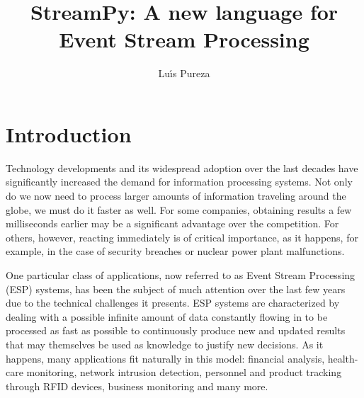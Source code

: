 \documentclass[twoside]{report}
\begin{document}
\title{StreamPy: A new language for Event Stream Processing}
\author{Lu\'{\i}s Pureza}

\maketitle

\tableofcontents

\chapter{Introduction}

Technology developments and its widespread adoption over the last decades have significantly increased the demand for information processing systems. Not only do we now need to process larger amounts of information traveling around the globe, we must do it faster as well. For some companies, obtaining results a few milliseconds earlier may be a significant advantage over the competition. For others, however, reacting immediately is of critical importance, as it happens, for example, in the case of security breaches or nuclear power plant malfunctions.

One particular class of applications, now referred to as Event Stream Processing (ESP) systems, has been the subject of much attention over the last few years due to the technical challenges it presents. ESP systems are characterized by dealing with a possible infinite amount of data constantly flowing in to be processed as fast as possible to continuously produce new and updated results that may themselves be used as knowledge to justify new decisions. As it happens, many applications fit naturally in this model: financial analysis, health-care monitoring, network intrusion detection, personnel and product tracking through RFID devices, business monitoring and many more.
\end{document}
